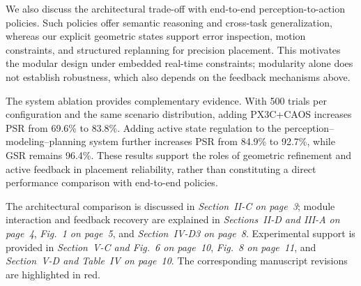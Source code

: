 \documentclass[journal,10pt]{IEEEtran}
\begin{document}
We also discuss the architectural trade-off with end-to-end perception-to-action policies. Such policies offer semantic reasoning and cross-task generalization, whereas our explicit geometric states support error inspection, motion constraints, and structured replanning for precision placement. This motivates the modular design under embedded real-time constraints; modularity alone does not establish robustness, which also depends on the feedback mechanisms above.

The system ablation provides complementary evidence. With 500 trials per configuration and the same scenario distribution, adding PX3C+CAOS increases PSR from 69.6\% to 83.8\%. Adding active state regulation to the perception--modeling--planning system further increases PSR from 84.9\% to 92.7\%, while GSR remains 96.4\%. These results support the roles of geometric refinement and active feedback in placement reliability, rather than constituting a direct performance comparison with end-to-end policies.

The architectural comparison is discussed in \textit{Section~II-C on page~3}; module interaction and feedback recovery are explained in \textit{Sections~II-D and III-A on page~4}, \textit{Fig.~1 on page~5}, and \textit{Section~IV-D3 on page~8}. Experimental support is provided in \textit{Section~V-C and Fig.~6 on page~10}, \textit{Fig.~8 on page~11}, and \textit{Section~V-D and Table~IV on page~10}. The corresponding manuscript revisions are highlighted in red.
\end{document}
